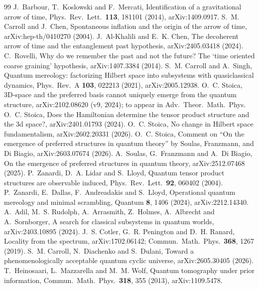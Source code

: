 \documentclass[11pt]{article}
\theoremstyle{definition}
\theoremstyle{remark}
\begin{document}
\begin{thebibliography}{99}
 J.~Barbour, T.~Koslowski and F.~Mercati, Identification of a gravitational arrow of time, Phys.\ Rev.\ Lett.\ \textbf{113}, 181101 (2014), arXiv:1409.0917.
 S.~M. Carroll and J.~Chen, Spontaneous inflation and the origin of the arrow of time, arXiv:hep-th/0410270 (2004).
 J.~Al-Khalili and E.~K. Chen, The decoherent arrow of time and the entanglement past hypothesis, arXiv:2405.03418 (2024). %
 C.~Rovelli, Why do we remember the past and not the future? The `time oriented coarse graining' hypothesis, arXiv:1407.3384 (2014).
 S.~M. Carroll and A.~Singh, Quantum mereology: factorizing Hilbert space into subsystems with quasiclassical dynamics, Phys.\ Rev.\ A \textbf{103}, 022213 (2021), arXiv:2005.12938.
 O.~C. Stoica, 3D-space and the preferred basis cannot uniquely emerge from the quantum structure, arXiv:2102.08620 (v9, 2024); to appear in Adv.\ Theor.\ Math.\ Phys.
 O.~C. Stoica, Does the Hamiltonian determine the tensor product structure and the 3d space?, arXiv:2401.01793 (2024).
 O.~C. Stoica, No change in Hilbert space fundamentalism, arXiv:2602.20331 (2026).
 O.~C. Stoica, Comment on ``On the emergence of preferred structures in quantum theory'' by Soulas, Franzmann, and Di Biagio, arXiv:2603.07674 (2026).
 A.~Soulas, G.~Franzmann and A.~Di Biagio, On the emergence of preferred structures in quantum theory, arXiv:2512.07468 (2025).
 P.~Zanardi, D.~A. Lidar and S.~Lloyd, Quantum tensor product structures are observable induced, Phys.\ Rev.\ Lett.\ \textbf{92}, 060402 (2004).
 P.~Zanardi, E.~Dallas, F.~Andreadakis and S.~Lloyd, Operational quantum mereology and minimal scrambling, Quantum \textbf{8}, 1406 (2024), arXiv:2212.14340.
 A.~Adil, M.~S. Rudolph, A.~Arrasmith, Z.~Holmes, A.~Albrecht and A.~Sornborger, A search for classical subsystems in quantum worlds, arXiv:2403.10895 (2024).
 J.~S. Cotler, G.~R. Penington and D.~H. Ranard, Locality from the spectrum, arXiv:1702.06142; Commun.\ Math.\ Phys.\ \textbf{368}, 1267 (2019).
 S.~M. Carroll, N.~Diachenko and S.~Dulani, Toward a phenomenologically acceptable quantum cyclic universe, arXiv:2605.30405 (2026).
 T.~Heinosaari, L.~Mazzarella and M.~M. Wolf, Quantum tomography under prior information, Commun.\ Math.\ Phys.\ \textbf{318}, 355 (2013), arXiv:1109.5478.

\end{thebibliography}
\end{document}
